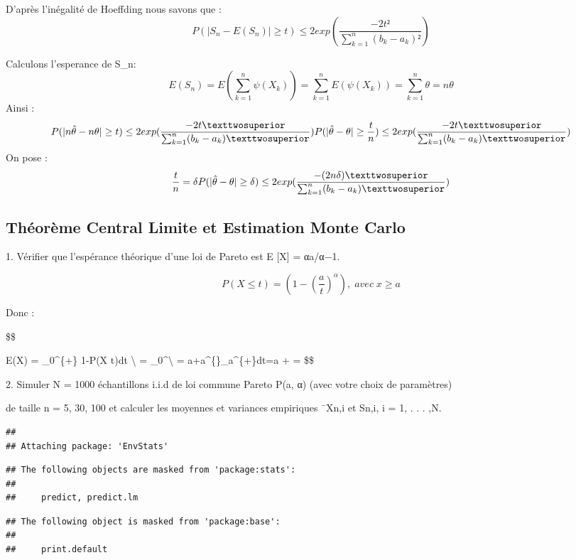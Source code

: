 \documentclass[
]{article}
\begin{document}
D'après l'inégalité de Hoeffding nous savons que : \[
P(|S_n - E(S_n)| \geq t) \leq 2exp(\frac{-2t²}{\sum_{k=1}^n (b_k-a_k)²})
\]

Calculons l'esperance de S\_n: \[
E(S_n) = E(\sum_{k=1}^n \psi(X_k)) = \sum_{k=1}^n E(\psi(X_k)) = \sum_{k=1}^n \theta = n\theta
\] Ainsi : \[
P(|n\hat{\theta} - n\theta| \geq t) \leq 2exp(\frac{-2t²}{\sum_{k=1}^n (b_k-a_k)²})
\\
P(|\hat{\theta} - \theta| \geq \frac{t}{n}) \leq 2exp(\frac{-2t²}{\sum_{k=1}^n (b_k-a_k)²})
\] On pose : \[
\frac{t}{n} = \delta
\\
P(|\hat{\theta} - \theta| \geq \delta) \leq 2exp(\frac{-(2n\delta)²}{\sum_{k=1}^n (b_k-a_k)²})
\]

\hypertarget{thuxe9oruxe8me-central-limite-et-estimation-monte-carlo}{%
\subsection{Théorème Central Limite et Estimation Monte
Carlo}\label{thuxe9oruxe8me-central-limite-et-estimation-monte-carlo}}

1. Vérifier que l'espérance théorique d'une loi de Pareto est E {[}X{]}
= αa/α−1.

\[
P(X\le t)= (1-\left( \frac{a}{t} \right)^{\alpha}) , \;avec \;x \ge a
\]

Donc :

\$\$

E(X) = \int\_0\^{}\{+\infty\} 1-P(X \le t)dt \textbackslash{} =
\int\_0\^{}\infty  \textbackslash{} =
a+a\^{}\{\alpha\}\int\_a\^{}\{+\infty\}dt=a +
 = \$\$

2. Simuler N = 1000 échantillons i.i.d de loi commune Pareto P(a, α)
(avec votre choix de paramètres)

de taille n = 5, 30, 100 et calculer les moyennes et variances
empiriques ¯Xn,i et Sn,i, i = 1, . . . ,N.

\begin{verbatim}
## 
## Attaching package: 'EnvStats'
\end{verbatim}

\begin{verbatim}
## The following objects are masked from 'package:stats':
## 
##     predict, predict.lm
\end{verbatim}

\begin{verbatim}
## The following object is masked from 'package:base':
## 
##     print.default
\end{verbatim}
\end{document}
